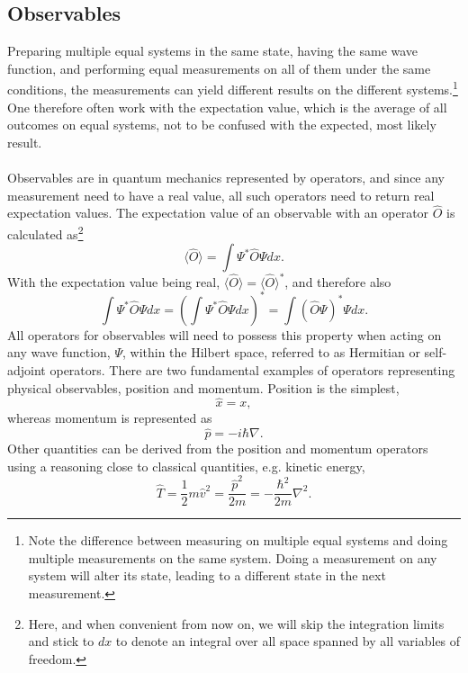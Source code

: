 \subsection{Observables}
Preparing multiple equal systems in the same state, having the same wave function, and performing equal measurements on all of them under the same conditions, the measurements can yield different results on the different systems.\footnote{Note the difference between measuring on 
multiple equal systems and doing
multiple measurements on the same system.
Doing a measurement on any system will alter its state, leading to a different
state in the next measurement.}
One therefore often work with the expectation value, which is the average of
all outcomes on equal systems, not to be confused with the expected, most
likely result.

\paragraph*{}
Observables are in quantum mechanics represented by operators, and since 
any measurement need to have a real value, all
such operators need to return real expectation values.
The expectation value of an observable with an operator $\hat{O}$ is calculated
as\footnote{Here, and when convenient from now on, we will skip the integration 
limits and stick to $dx$ to denote an integral over all space 
spanned by all variables of freedom.}
\begin{equation}
\label{eq:qm:expectation}
\langle \hat{O} \rangle = \int \Psi^{*} \hat{O} \Psi dx .
\end{equation}
With the expectation value being real, 
$\langle \hat{O} \rangle = \langle \hat{O} \rangle^{*}$, and therefore also
\begin{equation}
\label{eq:qm:hermitian}
\int \Psi^{*} \hat{O} \Psi dx 
= \left(\int \Psi^{*} \hat{O} \Psi dx\right)^{*}
= \int \left(\hat{O} \Psi\right)^{*} \Psi dx .
\end{equation}
All operators for observables will need to possess this property when acting on any wave function, $\Psi$, within the Hilbert space, referred to as Hermitian or self-adjoint operators.
There are two fundamental examples of operators representing physical observables, position and momentum. 
Position is the simplest, 
\begin{equation}
\label{eq:qm:operX}
\hat{x} = x,
\end{equation}
whereas momentum is represented as
\begin{equation}
\hat{p} = - i \hbar \nabla .
\end{equation}
Other quantities can be derived from the position and momentum operators using a
reasoning close to classical quantities, e.g. kinetic energy,
\begin{equation}
\hat{T} = \frac{1}{2} m \hat{v}^2 = \frac{\hat{p}^2}{2m} = - \frac{\hbar^2}{2m} \nabla^2 .
\end{equation}



